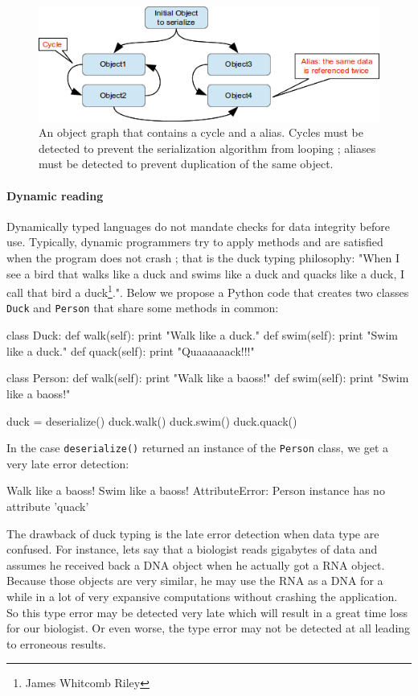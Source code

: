 \documentclass[a4paper]{report}
\newcommand{\ipython}[1]{\colorbox{white}{\lstinline[language=code]&#1&}} %
\begin{document}
\begin{figure}
\centering
\includegraphics{images/object_graph.png}
\caption{An object graph that contains a cycle and a alias. Cycles must be detected to prevent the serialization algorithm from looping ; aliases must be detected to prevent duplication of the same object.}
\label{object_graph}
\end{figure}

\paragraph{Dynamic reading} Dynamically typed languages do not mandate checks for data integrity before use. Typically, dynamic programmers try to apply methods and are satisfied when the program does not crash ; that is the duck typing philosophy: "When I see a bird that walks like a duck and swims like a duck and quacks like a duck, I call that bird a duck\footnote{James Whitcomb Riley}.". Below we propose a Python code that creates two classes \ipython{Duck} and \ipython{Person} that share some methods in common:
\begin{python}
class Duck:
	def walk(self):
		print "Walk like a duck."
	def swim(self):
		print "Swim like a duck."
	def quack(self):
		print "Quaaaaaack!!!"

class Person:
	def walk(self):
		print "Walk like a baoss!"
	def swim(self):
		print "Swim like a baoss!"

duck = deserialize()
duck.walk()
duck.swim()
duck.quack()
\end{python}
In the case \ipython{deserialize()} returned an instance of the \ipython{Person} class, we get a very late error detection:
\begin{shell}
Walk like a baoss!
Swim like a baoss!
AttributeError: Person instance has no attribute 'quack'
\end{shell}
The drawback of duck typing is the late error detection when data type are confused. For instance, lets say that a biologist reads gigabytes of data and assumes he received back a DNA object when he actually got a RNA object. Because those objects are very similar, he may use the RNA as a DNA for a while in a lot of very expansive computations without crashing the application. So this type error may be detected very late which will result in a great time loss for our biologist. Or even worse, the type error may not be detected at all leading to erroneous results.
\end{document}
